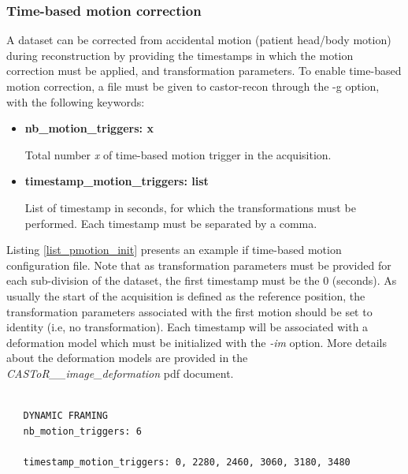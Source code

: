 \documentclass[a4paper, 11pt]{article}
\begin{document}
\bigskip
\subsubsection{Time-based motion correction}


A dataset can be corrected from accidental motion (patient head/body motion) during reconstruction by providing the timestamps in which the motion correction must be applied, and transformation parameters. To enable time-based motion correction, a file must be given to castor-recon through the -g option, with the following keywords:

\begin{itemize}
\item \textbf{nb\_motion\_triggers: x}  

Total number \textit{x} of time-based motion trigger in the acquisition. 
   
\item \textbf{timestamp\_motion\_triggers: list } 

List of timestamp in seconds, for which the transformations must be performed. Each timestamp must be separated by a comma.
          
\end{itemize}

Listing \ref{list_pmotion_init} presents an example if time-based motion configuration file. Note that as transformation parameters must be provided for each sub-division of the dataset, the first timestamp must be the 0 (seconds). As usually the start of the acquisition is defined as the reference position, the transformation parameters associated with the first motion should be set to identity (i.e, no transformation). Each timestamp will be associated with a deformation model which must be initialized with the \textit{-im} option. More details about the deformation models are provided in the \textit{CASToR\_\_image\_deformation} pdf document.


\begin{lstlisting}[label={list_pmotion_init},caption= Example of time-based motion keyword initialization.]

   DYNAMIC FRAMING
   nb_motion_triggers: 6
   
   timestamp_motion_triggers: 0, 2280, 2460, 3060, 3180, 3480

\end{lstlisting}    
\end{document}
